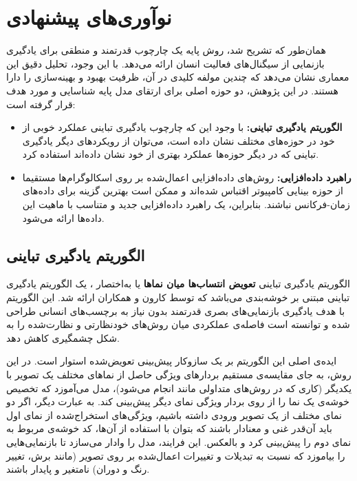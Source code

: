 \section{نوآوری‌های پیشنهادی}

همان‌طور که تشریح شد، روش پایه یک چارچوب قدرتمند و منطقی برای یادگیری بازنمایی از سیگنال‌های فعالیت انسان ارائه می‌دهد. با این وجود، تحلیل دقیق این معماری نشان می‌دهد که چندین مولفه کلیدی در آن، ظرفیت بهبود و بهینه‌سازی را دارا هستند. در این پژوهش، دو حوزه اصلی برای ارتقای مدل پایه شناسایی و مورد هدف قرار گرفته است:
\begin{itemize}
    \item\textbf{الگوریتم یادگیری تباینی:}
    با وجود این که چارچوب یادگیری تباینی 
    عملکرد خوبی از خود در حوزه‌های مختلف نشان داده است، می‌توان از رویکردهای دیگر یادگیری تباینی که در دیگر حوزه‌ها عملکرد بهتری از خود نشان داده‌اند استفاده کرد.
    \item\textbf{راهبرد داده‌افزایی:}
    روش‌های داده‌افزایی اعمال‌شده بر روی اسکالوگرام‌ها مستقیما از حوزه بینایی کامپیوتر اقتباس شده‌اند و ممکن است بهترین گزینه برای داده‌های زمان-فرکانس نباشند. بنابراین، یک راهبرد داده‌افزایی جدید و متناسب با ماهیت این داده‌ها ارائه می‌شود.
\end{itemize}

\subsection{الگوریتم یادگیری تباینی }

الگوریتم یادگیری تباینی
\textbf{تعویض انتساب‌ها میان نماها} یا به‌اختصار ،
یک الگوریتم یادگیری تباینی مبتنی بر خوشه‌بندی می‌باشد که توسط کارون و همکاران\cite{caron2020unsupervised} ارائه شد. این الگوریتم با هدف یادگیری بازنمایی‌های بصری قدرتمند بدون نیاز به برچسب‌های انسانی طراحی شده و توانسته است فاصله‌ی عملکردی میان روش‌های خودنظارتی و نظارت‌شده را به شکل چشمگیری کاهش دهد.

ایده‌ی اصلی این الگوریتم بر یک سازوکار پیش‌بینی تعویض‌شده
استوار است. در این روش، به جای مقایسه‌ی مستقیم بردارهای ویژگی حاصل از نماهای مختلف یک تصویر با یکدیگر (کاری که در روش‌های متداولی مانند  انجام می‌شود)، مدل می‌آموزد که تخصیص خوشه‌ی یک نما را از روی بردار ویژگی نمای دیگر پیش‌بینی کند. به عبارت دیگر، اگر دو نمای مختلف از یک تصویر ورودی داشته باشیم، ویژگی‌های استخراج‌شده از نمای اول باید آن‌قدر غنی و معنادار باشند که بتوان با استفاده از آن‌ها، کد خوشه‌ی مربوط به نمای دوم را پیش‌بینی کرد و بالعکس. این فرایند، مدل را وادار می‌سازد تا بازنمایی‌هایی را بیاموزد که نسبت به تبدیلات و تغییرات اعمال‌شده بر روی تصویر (مانند برش، تغییر رنگ و دوران) نامتغیر و پایدار باشند.

